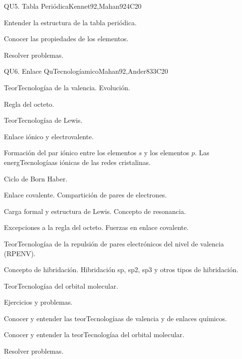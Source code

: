\begin{syllabus}
\begin{unit}{QU5. Tabla Periódica}{}{Kennet92,Mahan92}{4}{C20}
   \begin{learningoutcomes}
      \item Entender la estructura de la tabla periódica.
      \item Conocer las propiedades de los elementos.
      \item Resolver problemas.
   \end{learningoutcomes}
\end{unit}

\begin{unit}{QU6. Enlace QuTecnologíamico}{}{Mahan92,Ander83}{3}{C20}
   \begin{topics}
	\item TeorTecnologíaa de  la valencia. Evolución.
	\item Regla del octeto.
	\item TeorTecnologíaa de Lewis.
	\item Enlace iónico y electrovalente.
	\item Formación del par iónico entre los elementos $s$ y los elementos $p$. Las energTecnologíaas iónicas de las redes cristalinas.
	\item Ciclo de Born Haber.
	\item Enlace covalente. Compartición de pares de electrones.
	\item Carga formal y estructura de Lewis. Concepto de resonancia.
	\item Excepciones a la regla del octeto. Fuerzas en enlace covalente.
	\item TeorTecnologíaa de la repulsión de pares electrónicos del nivel de valencia (RPENV).
	\item Concepto de hibridación. Hibridación sp, sp2, sp3 y otros tipos de hibridación.
	\item TeorTecnologíaa del orbital molecular.
	\item Ejercicios y problemas.
   \end{topics}

   \begin{learningoutcomes}
      \item Conocer y entender las teorTecnologíaas de valencia y de enlaces químicos.
      \item Conocer y entender la teorTecnologíaa del orbital molecular.
      \item Resolver problemas.
   \end{learningoutcomes}
\end{unit}


\end{syllabus}
